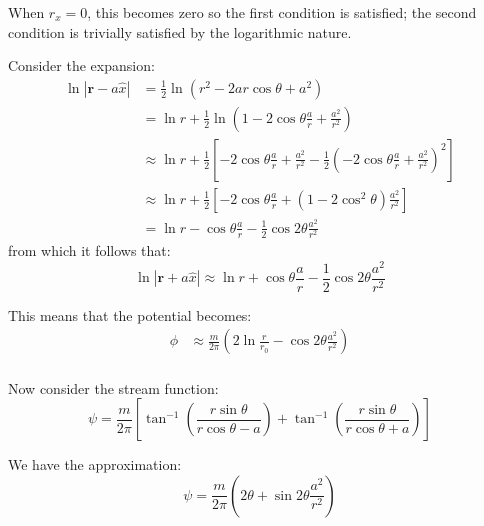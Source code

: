 \documentclass[12pt]{article}
\begin{document}
When $r_{x} = 0$, this becomes zero so the first condition is satisfied; the second condition is trivially satisfied by the logarithmic nature.

Consider the expansion:
\begin{equation}
    \begin{split}
        \ln{\left\lvert \mathbf{r} - a \hat{x} \right\rvert} &= \frac{1}{2} \ln{\left( r^{2} - 2ar\cos{\theta} + a^{2} \right)} \\
        &= \ln{r} + \frac{1}{2} \ln{\left( 1 - 2\cos{\theta}\frac{a}{r} + \frac{a^{2}}{r^{2}} \right)} \\
        &\approx \ln{r} + \frac{1}{2} \left[ -2\cos{\theta}\frac{a}{r} + \frac{a^{2}}{r^{2}} - \frac{1}{2} \left( -2\cos{\theta}\frac{a}{r} + \frac{a^{2}}{r^{2}} \right)^{2} \right] \\
        &\approx \ln{r} + \frac{1}{2} \left[ -2\cos{\theta}\frac{a}{r} + \left( 1 - 2\cos^{2}{\theta} \right) \frac{a^{2}}{r^{2}} \right] \\
        &= \ln{r} - \cos{\theta} \frac{a}{r} - \frac{1}{2} \cos{2\theta} \frac{a^{2}}{r^{2}}
    \end{split}
\end{equation}
from which it follows that:
\begin{equation}
    \ln{\left\lvert \mathbf{r} + a \hat{x} \right\rvert} \approx \ln{r} + \cos{\theta} \frac{a}{r} - \frac{1}{2} \cos{2\theta} \frac{a^{2}}{r^{2}}
\end{equation}

This means that the potential becomes:
\begin{equation}
    \begin{split}
        \phi &\approx \frac{m}{2\pi} \left( 2\ln{\frac{r}{r_{0}}} - \cos{2\theta} \frac{a^{2}}{r^{2}} \right) \\
    \end{split}
\end{equation}

Now consider the stream function:
\begin{equation}
    \psi = \frac{m}{2\pi} \left[ \tan^{-1}{\left( \frac{r\sin{\theta}}{r\cos{\theta} - a} \right)} + \tan^{-1}{\left( \frac{r\sin{\theta}}{r\cos{\theta} + a} \right)} \right]
\end{equation}

We have the approximation:
\begin{equation}
    \psi = \frac{m}{2\pi} \left( 2\theta + \sin{2\theta} \frac{a^{2}}{r^{2}} \right)
\end{equation}
\end{document}
